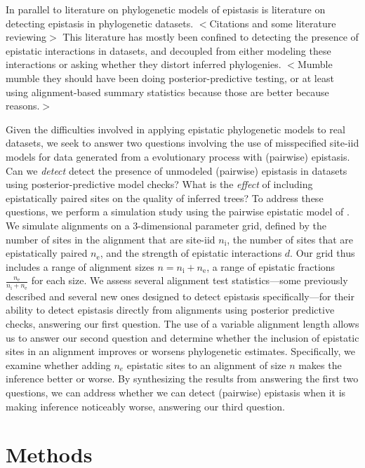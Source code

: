 \documentclass[11pt]{article}
\begin{document}
In parallel to literature on phylogenetic models of epistasis is literature on detecting epistasis in phylogenetic datasets.
$<$Citations and some literature reviewing$>$
This literature has mostly been confined to detecting the presence of epistatic interactions in datasets, and decoupled from either modeling these interactions or asking whether they distort inferred phylogenies.
$<$Mumble mumble they should have been doing posterior-predictive testing, or at least using alignment-based summary statistics because those are better because reasons.$>$

Given the difficulties involved in applying epistatic phylogenetic models to real datasets, we seek to answer two questions involving the use of misspecified site-iid models for data generated from a evolutionary process with (pairwise) epistasis.
Can we \textit{detect} detect the presence of unmodeled (pairwise) epistasis in datasets using posterior-predictive model checks?
What is the \textit{effect} of including epistatically paired sites on the quality of inferred trees?
To address these questions, we perform a simulation study using the pairwise epistatic model of \cite{nasrallah2013phylogenetic}.
We simulate alignments on a 3-dimensional parameter grid, defined by the number of sites in the alignment that are site-iid $n_{\mathrm{i}}$, the number of sites that are epistatically paired $n_{\mathrm{e}}$, and the strength of epistatic interactions $d$.
Our grid thus includes a range of alignment sizes $n = n_{\mathrm{i}}+n_{\mathrm{e}}$, a range of epistatic fractions $\frac{n_{\mathrm{e}}}{n_{\mathrm{i}}+n_{\mathrm{e}}}$ for each size.
We assess several alignment test statistics---some previously described and several new ones designed to detect epistasis specifically---for their ability to detect epistasis directly from alignments using posterior predictive checks, answering our first question.
The use of a variable alignment length allows us to answer our second question and determine whether the inclusion of epistatic sites in an alignment improves or worsens phylogenetic estimates.
Specifically, we examine whether adding $n_e$ epistatic sites to an alignment of size $n$ makes the inference better or worse.
By synthesizing the results from answering the first two questions, we can address whether we can detect (pairwise) epistasis when it is making inference noticeably worse, answering our third question.

\section*{Methods\label{sec:methods}}
\end{document}
